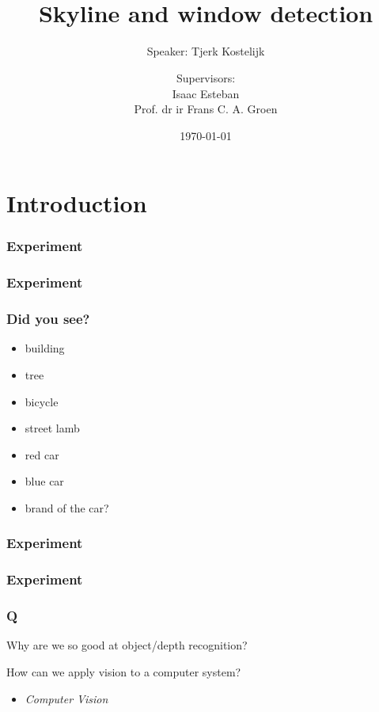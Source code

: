 \documentclass{beamer}
\title{\LARGE \sc{Semantic annotation of urban scenes:}\\Skyline and window detection}
\subtitle{Speaker: Tjerk Kostelijk}
\author{Supervisors: \\Isaac Esteban\\Prof. dr ir Frans C. A. Groen}
\date{\today}
\begin{document}


\frame{\titlepage}




\section{Introduction}

\frame
{
	\frametitle{Experiment}
}


\frame
{
	\frametitle{Experiment}
}


\frame
{
	\frametitle{Did you see?}
	\begin{itemize}
		\item  <+-| alert@+> building
		\item  <+-| alert@+> tree
		\item  <+-| alert@+> bicycle
		\item  <+-| alert@+> street lamb
		\item  <+-| alert@+> red car
		\item  <+-| alert@+> blue car
		\item  <+-| alert@+> brand of the car?
	\end{itemize}
}


\frame
{
	\frametitle{Experiment}
}

\frame
{
	\frametitle{Experiment}
}


\frame
{
	\frametitle{Q}
	\item  <+-| alert@+> Why are we so good at object/depth recognition?
	\item  <+-| alert@+> How can we apply vision to a computer system?
		\begin{itemize}
			\item  <+-| alert@+> {\textit{Computer Vision}}
		\end{itemize}
}
\end{document}
